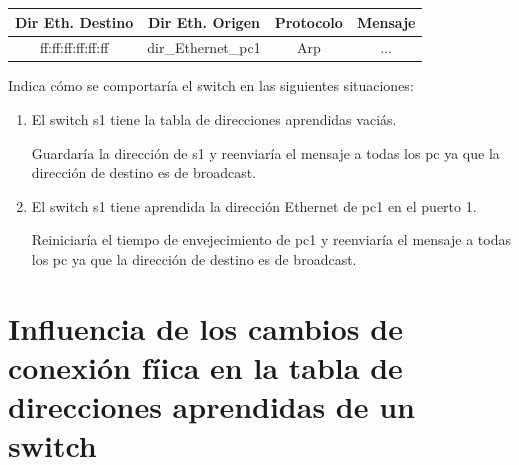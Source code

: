\documentclass[12pt, a4paper]{report}
\begin{document}
\begin{enumerate}
	\begin{tabular}{ |c|c|c|c| } 
		\hline
		Dir Eth. Destino & Dir Eth. Origen & Protocolo & Mensaje\\ 
		\hline
		ff:ff:ff:ff:ff:ff & dir\_Ethernet\_pc1 & Arp & ...\\ 
		\hline
	\end{tabular}
	
	Indica cómo se comportaría el switch en las siguientes situaciones:
	\begin{enumerate}[label=\alph*]
		\item El switch s1 tiene la tabla de direcciones aprendidas vaciás.
		
		Guardaría la dirección de s1 y reenviaría el mensaje a todas los pc ya que la dirección de destino es de broadcast.
		\item El switch s1 tiene aprendida la dirección Ethernet de pc1 en el puerto 1.
		
		Reiniciaría el tiempo de envejecimiento de pc1 y reenviaría el mensaje a todas los pc ya que la dirección de destino es de broadcast.
	\end{enumerate}
\end{enumerate}
\section{Influencia de los cambios de conexión fíica en la tabla de direcciones	aprendidas de un switch}
\end{document}

